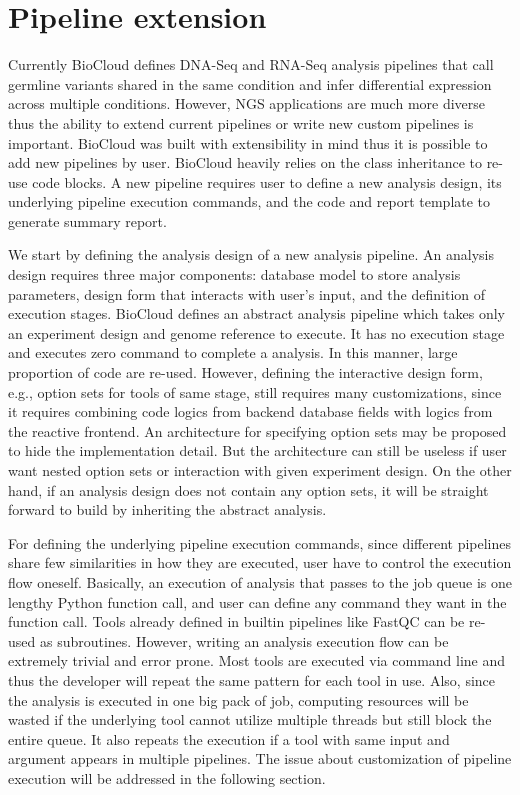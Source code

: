 \section{Pipeline extension}
\label{s:pipeline-extension}

Currently BioCloud defines DNA-Seq and RNA-Seq analysis pipelines that call
germline variants shared in the same condition and infer differential
expression across multiple conditions. However, NGS applications are much more
diverse thus the ability to extend current pipelines or write new custom
pipelines is important. BioCloud was built with extensibility in mind thus it
is possible to add new pipelines by user. BioCloud heavily relies on the class
inheritance to re-use code blocks. A new pipeline requires user to define a new
analysis design, its underlying pipeline execution commands, and the code and
report template to generate summary report.

We start by defining the analysis design of a new analysis pipeline. An
analysis design requires three major components: database model to store
analysis parameters, design form that interacts with user's input, and the
definition of execution stages. BioCloud defines an abstract analysis pipeline
which takes only an experiment design and genome reference to execute. It has
no execution stage and executes zero command to complete a analysis. In this
manner, large proportion of code are re-used. However, defining the interactive
design form, e.g., option sets for tools of same stage, still requires many
customizations, since it requires combining code logics from backend database
fields with logics from the reactive frontend. An architecture for specifying
option sets may be proposed to hide the implementation detail. But the
architecture can still be useless if user want nested option sets or
interaction with given experiment design. On the other hand, if an analysis
design does not contain any option sets, it will be straight forward to build
by inheriting the abstract analysis.

For defining the underlying pipeline execution commands, since different
pipelines share few similarities in how they are executed, user have to control
the execution flow oneself. Basically, an execution of analysis that passes to
the job queue is one lengthy Python function call, and user can define any
command they want in the function call. Tools already defined in builtin
pipelines like FastQC can be re-used as subroutines. However, writing an
analysis execution flow can be extremely trivial and error prone. Most tools
are executed via command line and thus the developer will repeat the same
pattern for each tool in use. Also, since the analysis is executed in one big
pack of job, computing resources will be wasted if the underlying tool cannot
utilize multiple threads but still block the entire queue. It also repeats the
execution if a tool with same input and argument appears in multiple pipelines.
The issue about customization of pipeline execution will be addressed in the
following section.

